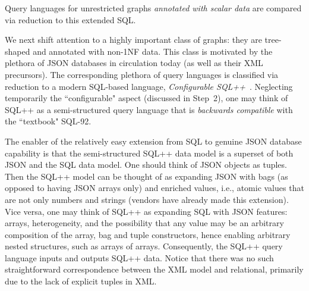 Query languages for unrestricted graphs {\em annotated with scalar data} are compared via reduction to this extended SQL.



We next shift attention to a highly important class of graphs: they are tree-shaped and annotated with non-1NF data.
This class is motivated by the plethora of JSON databases in circulation today (as well as their XML precursors).
The corresponding plethora of query languages is classified via reduction to a modern SQL-based language, \emph{Configurable SQL++}~\cite{sqlpp-extended-corr-2015}.
Neglecting temporarily the ``configurable" aspect (discussed in Step~2), one may think of SQL++ as a semi-structured query language that is
{\em backwards compatible} with the ``textbook" SQL-92.

The enabler of the relatively easy extension from SQL to genuine JSON database capability is that the semi-structured SQL++ data model is a superset of both JSON and the SQL data model. One should think of JSON objects as tuples. Then the SQL++ model can be thought of as expanding JSON with bags (as opposed to having JSON arrays only) and enriched values, i.e., atomic values that are not only numbers and strings (vendors have already made this extension).
Vice versa, one may think of SQL++ as expanding SQL with JSON features: arrays, heterogeneity, and the possibility that any value may be an arbitrary composition of the array, bag and tuple constructors, hence enabling arbitrary nested structures, such as arrays of arrays. Consequently, the SQL++ query language inputs and outputs SQL++ data. Notice that there was no such straightforward correspondence between the XML model and relational, primarily due to the lack of explicit tuples in XML.

